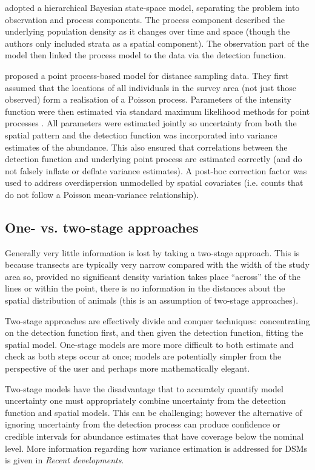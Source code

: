 \documentclass[a4paper,12pt]{article}
\begin{document}
\cite{Moore:2011jf} adopted a hierarchical Bayesian state-space model, separating the problem into observation and process components. The process component described the underlying population density as it changes over time and space (though the authors only included strata as a spatial component). The observation part of the model then linked the process model to the data via the detection function. 

\cite{Johnson:2010gf} proposed a point process-based model for distance sampling data. They first assumed that the locations of all individuals in the survey area (not just those observed) form a realisation of a Poisson process. Parameters of the intensity function were then estimated via standard maximum likelihood methods for point processes \citep{Baddeley:2000to}. All parameters were estimated jointly so uncertainty from both the spatial pattern and the detection function was incorporated into variance estimates of the abundance. This also ensured that correlations between the detection function and underlying point process are estimated correctly (and do not falsely inflate or deflate variance estimates). A post-hoc correction factor was used to address overdispersion unmodelled by spatial covariates (i.e. counts that do not follow a Poisson mean-variance relationship).

\subsection*{One- vs. two-stage approaches}

Generally very little information is lost by taking a two-stage approach. This is because transects are typically very narrow compared with the width of the study area so, provided no significant density variation takes place ``across'' the of the lines or within the point, there is no information in the distances about the spatial distribution of animals (this is an assumption of two-stage approaches). 

Two-stage approaches are effectively divide and conquer techniques: concentrating on the detection function first, and then given the detection function, fitting the spatial model. One-stage models are more more difficult to both estimate and check as both steps occur at once; models are potentially simpler from the perspective of the user and perhaps more mathematically elegant.

 Two-stage models have the disadvantage that to accurately quantify model uncertainty one must appropriately combine uncertainty from the detection function and spatial models. This can be challenging; however the alternative of ignoring uncertainty from the detection process \cite[e.g.][]{Niemi:2010kx} can produce confidence or credible intervals for abundance estimates that have coverage below the nominal level. More information regarding how variance estimation is addressed for DSMs is given in \textit{Recent developments}.
\end{document}
